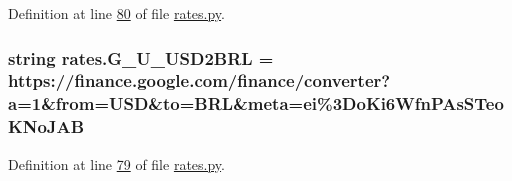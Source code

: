 Definition at line \hyperlink{rates_8py_source_l00080}{80} of file \hyperlink{rates_8py_source}{rates.\+py}.

\subsubsection[{\texorpdfstring{G\+\_\+\+U\+\_\+\+U\+S\+D2\+B\+RL}{G_U_USD2BRL}}]{\setlength{\rightskip}{0pt plus 5cm}string rates.\+G\+\_\+\+U\+\_\+\+U\+S\+D2\+B\+RL = \textquotesingle{}https\+://finance.\+google.\+com/finance/converter?a=1\&from=U\+SD\&to=B\+RL\&meta=ei\%3\+Do\+Ki6\+Wfn\+P\+As\+S\+Teo\+K\+No\+J\+A\+B\textquotesingle{}}\hypertarget{namespacerates_a0ba47a320577d69e1955c13a384dd662}{}\label{namespacerates_a0ba47a320577d69e1955c13a384dd662}


Definition at line \hyperlink{rates_8py_source_l00079}{79} of file \hyperlink{rates_8py_source}{rates.\+py}.

